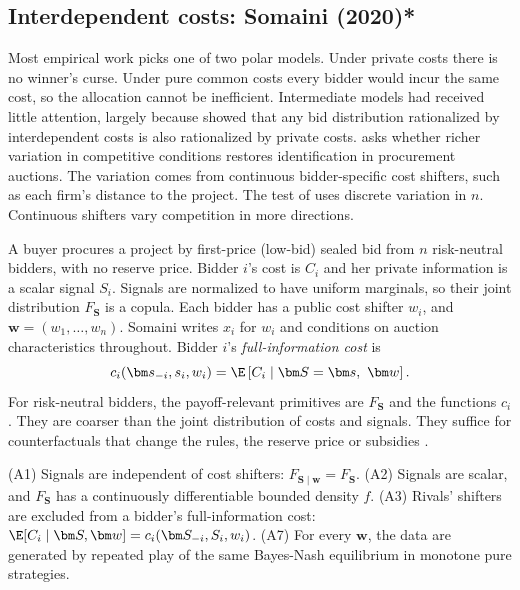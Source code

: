 \subsection{Interdependent costs: Somaini (2020)*}\label{sec:15-cv-somaini}

 Most empirical work picks one of two polar models. Under private costs there is no
winner's curse. Under pure common costs every bidder would incur the same cost, so the allocation cannot be
inefficient. Intermediate models had received little attention, largely because \citet{LaffontVuong1996}
showed that any bid distribution rationalized by interdependent costs is also rationalized by private costs.
\citet{Somaini2020} asks whether richer variation in competitive conditions restores identification in
procurement auctions. The variation comes from continuous bidder-specific cost shifters, such as each firm's
distance to the project. The test of \citet{HaileHongShum2003} uses discrete variation in $n$. Continuous
shifters vary competition in more directions.

 A buyer procures a project by first-price (low-bid) sealed bid from $n$ risk-neutral
bidders, with no reserve price. Bidder $i$'s cost is $C_i$ and her private information is a scalar signal
$S_i$. Signals are normalized to have uniform marginals, so their joint distribution $F_{\bm S}$ is a copula.
Each bidder has a public cost shifter $w_i$, and $\bm w=(w_1,\dots,w_n)$. Somaini writes $x_i$ for $w_i$ and
conditions on auction characteristics throughout. Bidder $i$'s \emph{full-information cost} is
\begin{equation*}
  c_i(\bm s_{-i},s_i,w_i)=\E\left[C_i\mid \bm S=\bm s,\ \bm w\right].
\end{equation*}
For risk-neutral bidders, the payoff-relevant primitives are $F_{\bm S}$ and the functions $c_i$. They are
coarser than the joint distribution of costs and signals. They suffice for counterfactuals that change the rules,
the reserve price or subsidies \citep[Section~I]{Somaini2020}.

\begin{assumption}\label{ass:15-somaini}
(A1) Signals are independent of cost shifters: $F_{\bm S\mid\bm w}=F_{\bm S}$. (A2) Signals are scalar, and
$F_{\bm S}$ has a continuously differentiable bounded density $f$. (A3) Rivals' shifters are excluded from a
bidder's full-information cost: $\E[C_i\mid\bm S,\bm w]=c_i(\bm S_{-i},S_i,w_i)$. (A7) For every $\bm w$, the
data are generated by repeated play of the same Bayes-Nash equilibrium in monotone pure strategies.
\end{assumption}

